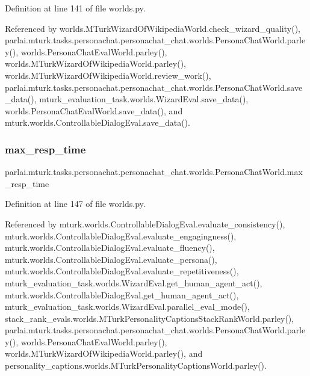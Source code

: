 Definition at line 141 of file worlds.\+py.



Referenced by worlds.\+M\+Turk\+Wizard\+Of\+Wikipedia\+World.\+check\+\_\+wizard\+\_\+quality(), parlai.\+mturk.\+tasks.\+personachat.\+personachat\+\_\+chat.\+worlds.\+Persona\+Chat\+World.\+parley(), worlds.\+Persona\+Chat\+Eval\+World.\+parley(), worlds.\+M\+Turk\+Wizard\+Of\+Wikipedia\+World.\+parley(), worlds.\+M\+Turk\+Wizard\+Of\+Wikipedia\+World.\+review\+\_\+work(), parlai.\+mturk.\+tasks.\+personachat.\+personachat\+\_\+chat.\+worlds.\+Persona\+Chat\+World.\+save\+\_\+data(), mturk\+\_\+evaluation\+\_\+task.\+worlds.\+Wizard\+Eval.\+save\+\_\+data(), worlds.\+Persona\+Chat\+Eval\+World.\+save\+\_\+data(), and mturk.\+worlds.\+Controllable\+Dialog\+Eval.\+save\+\_\+data().

\mbox{\label{classparlai_1_1mturk_1_1tasks_1_1personachat_1_1personachat__chat_1_1worlds_1_1PersonaChatWorld_aca25d3660a3dac91fa40ec7a18b214f5}} 
\subsubsection{\texorpdfstring{max\+\_\+resp\+\_\+time}{max\_resp\_time}}
{\footnotesize\ttfamily parlai.\+mturk.\+tasks.\+personachat.\+personachat\+\_\+chat.\+worlds.\+Persona\+Chat\+World.\+max\+\_\+resp\+\_\+time}



Definition at line 147 of file worlds.\+py.



Referenced by mturk.\+worlds.\+Controllable\+Dialog\+Eval.\+evaluate\+\_\+consistency(), mturk.\+worlds.\+Controllable\+Dialog\+Eval.\+evaluate\+\_\+engagingness(), mturk.\+worlds.\+Controllable\+Dialog\+Eval.\+evaluate\+\_\+fluency(), mturk.\+worlds.\+Controllable\+Dialog\+Eval.\+evaluate\+\_\+persona(), mturk.\+worlds.\+Controllable\+Dialog\+Eval.\+evaluate\+\_\+repetitiveness(), mturk\+\_\+evaluation\+\_\+task.\+worlds.\+Wizard\+Eval.\+get\+\_\+human\+\_\+agent\+\_\+act(), mturk.\+worlds.\+Controllable\+Dialog\+Eval.\+get\+\_\+human\+\_\+agent\+\_\+act(), mturk\+\_\+evaluation\+\_\+task.\+worlds.\+Wizard\+Eval.\+parallel\+\_\+eval\+\_\+mode(), stack\+\_\+rank\+\_\+evals.\+worlds.\+M\+Turk\+Personality\+Captions\+Stack\+Rank\+World.\+parley(), parlai.\+mturk.\+tasks.\+personachat.\+personachat\+\_\+chat.\+worlds.\+Persona\+Chat\+World.\+parley(), worlds.\+Persona\+Chat\+Eval\+World.\+parley(), worlds.\+M\+Turk\+Wizard\+Of\+Wikipedia\+World.\+parley(), and personality\+\_\+captions.\+worlds.\+M\+Turk\+Personality\+Captions\+World.\+parley().

